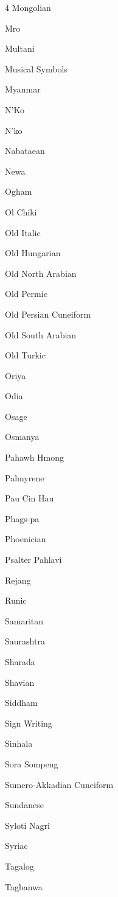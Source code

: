 \documentclass[a4paper]{l3doc}
\begin{document}
\begin{table}[!hbp]
\begin{multicols}{4}
    Mongolian \par
    Mro \par
    Multani \par
    Musical Symbols \par
    Myanmar \par
    \dup N'Ko \par
    \dup N'ko \par
    Nabataean \par
    Newa \par
    Ogham \par
    Ol Chiki \par
    Old Italic \par
    Old Hungarian \par
    Old North Arabian \par
    Old Permic \par
    Old Persian Cuneiform \par
    Old South Arabian \par
    Old Turkic \par
    \dup Oriya \par
    \dup Odia \par
    Osage \par
    Osmanya \par
    Pahawh Hmong \par
    Palmyrene \par
    Pau Cin Hau \par
    Phags-pa \par
    Phoenician \par
    Psalter Pahlavi \par
    Rejang \par
    Runic \par
    Samaritan \par
    Saurashtra \par
    Sharada \par
    Shavian \par
    Siddham \par
    Sign Writing \par
    Sinhala \par
    Sora Sompeng \par
    Sumero-Akkadian Cuneiform \par
    Sundanese \par
    Syloti Nagri \par
    Syriac \par
    Tagalog \par
    Tagbanwa \par

\end{multicols}
\end{table}
\end{document}
